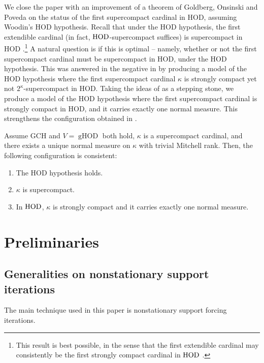 \documentclass[11pt]{amsart}
\newenvironment{manualtheorem}[1]{%
  \IfBlankTF{#1}
    {\renewcommand{\themanualtheoreminner}{\unskip}}
    {\renewcommand\themanualtheoreminner{#1}}%
  \manualtheoreminner
}{\endmanualtheoreminner}
\theoremstyle{definition}
\theoremstyle{remark}
\newcommand\HOD{\textnormal{HOD}}
\newcommand\<{{<}}
\DeclareMathOperator{\gHOD}{gHOD}
\begin{document}
\smallskip

We close the paper with an improvement of a theorem of Goldberg, Onsinski and Poveda 
\cite{GoldbergPoveda} on the status of the first supercompact cardinal in HOD, assuming Woodin's HOD hypothesis. Recall that under the HOD hypothesis, the first extendible cardinal (in fact, $\HOD$-supercompact suffices) is supercompact in HOD \cite{WooPartI, WooDavRod}.\footnote{This result is best possible, in the sense that the first extendible cardinal may consistently be the first strongly compact cardinal in $\HOD$ \cite{GoldbergPoveda}.} A natural question is if this is optimal -- namely, whether or not the first supercompact cardinal must be supercompact in HOD, under the HOD hypothesis.  This was answered in the negative in \cite{GoldbergPoveda} by producing a model of the HOD hypothesis where the first supercompact cardinal $\kappa$ is strongly compact yet not $2^\kappa$-supercompact in HOD. Taking the ideas of \cite{GoldbergPoveda} as a stepping stone, we  produce a model of the HOD hypothesis where the first supercompact cardinal is strongly compact in HOD, and it carries exactly one normal measure. This strengthens the configuration obtained in \cite{GoldbergPoveda}.


\begin{manualtheorem}{\ref{thm: Hod hypothesis}}
Assume $\mathrm{GCH}$ and $V=\gHOD$ both hold, $\kappa$ is a supercompact cardinal, and there exists a unique normal measure on $\kappa$ with trivial Mitchell rank. Then, the following configuration is consistent:
    \begin{enumerate}
        \item The $\mathrm{HOD}$ hypothesis holds.
        \item $\kappa$ is supercompact.
        \item In $\HOD$, $\kappa$ is strongly compact  and it carries exactly one normal measure. 
    \end{enumerate}    
\end{manualtheorem}






 

\section{Preliminaries}\label{sec: preliminaries}

\subsection{Generalities on nonstationary support iterations}
The main technique used in this paper is nonstationary support forcing iterations.
\end{document}
